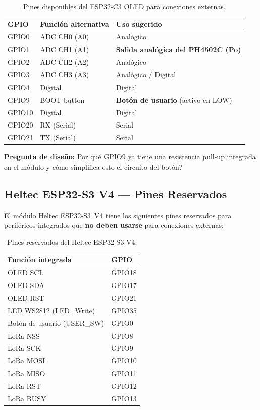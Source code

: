 \documentclass[12pt,leqno]{article}
\begin{document}
\begin{table}[h]
\centering
\begin{tabular}{|p{2.5cm}|p{4cm}|p{6cm}|}
\hline
\textbf{GPIO} & \textbf{Funci\'on alternativa} & \textbf{Uso sugerido} \\
\hline
GPIO0 & ADC CH0 (A0) & Anal\'ogico \\
\hline
GPIO1 & ADC CH1 (A1) & \textbf{Salida anal\'ogica del PH4502C (Po)} \\
\hline
GPIO2 & ADC CH2 (A2) & Anal\'ogico \\
\hline
GPIO3 & ADC CH3 (A3) & Anal\'ogico / Digital \\
\hline
GPIO4 & Digital & Digital \\
\hline
GPIO9 & BOOT button & \textbf{Bot\'on de usuario} (activo en LOW) \\
\hline
GPIO10 & Digital & Digital \\
\hline
GPIO20 & RX (Serial) & Serial \\
\hline
GPIO21 & TX (Serial) & Serial \\
\hline
\end{tabular}
\caption{Pines disponibles del ESP32-C3 OLED para conexiones externas.}
\end{table}

\noindent\textbf{Pregunta de dise\~no:} \textquestiondown Por qu\'e GPIO9 ya tiene
una resistencia pull-up integrada en el m\'odulo y c\'omo simplifica esto el
circuito del bot\'on?

\subsection{Heltec ESP32-S3 V4 --- Pines Reservados}

El m\'odulo Heltec ESP32-S3~V4 tiene los siguientes pines reservados para
perif\'ericos integrados que \textbf{no deben usarse} para conexiones externas:

\begin{table}[h]
\centering
\begin{tabular}{|p{6cm}|p{3cm}|}
\hline
\textbf{Funci\'on integrada} & \textbf{GPIO} \\
\hline
OLED SCL & GPIO18 \\
\hline
OLED SDA & GPIO17 \\
\hline
OLED RST & GPIO21 \\
\hline
LED WS2812 (LED\_Write) & GPIO35 \\
\hline
Bot\'on de usuario (USER\_SW) & GPIO0 \\
\hline
LoRa NSS & GPIO8 \\
\hline
LoRa SCK & GPIO9 \\
\hline
LoRa MOSI & GPIO10 \\
\hline
LoRa MISO & GPIO11 \\
\hline
LoRa RST & GPIO12 \\
\hline
LoRa BUSY & GPIO13 \\
\hline
\end{tabular}
\caption{Pines reservados del Heltec ESP32-S3 V4.}
\end{table}
\end{document}
